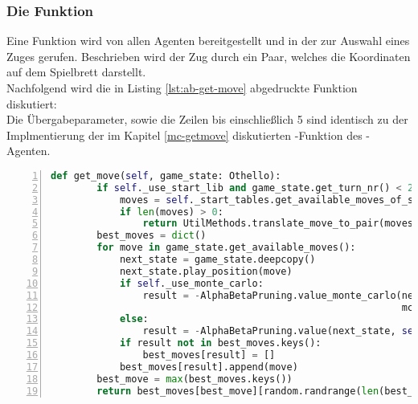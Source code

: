 \subsubsection{Die Funktion }
Eine Funktion  wird von allen Agenten bereitgestellt und in der  zur Auswahl eines Zuges gerufen. Beschrieben wird der Zug durch ein Paar, welches die Koordinaten auf dem Spielbrett darstellt.
\\Nachfolgend wird die in Listing \ref{lst:ab-get-move} abgedruckte Funktion diskutiert:
\\Die Übergabeparameter, sowie die Zeilen bis einschließlich 5 sind identisch zu der Implmentierung der im Kapitel \ref{mc-getmove} diskutierten -Funktion des -Agenten.

\begin{lstlisting}[caption = {get\_move Funktion des Alpha-Beta Spielers}, language = python, captionpos = t , numbers=left, label={lst:ab-get-move}]
    def get_move(self, game_state: Othello):
        if self._use_start_lib and game_state.get_turn_nr() < 21:
            moves = self._start_tables.get_available_moves_of_start_tables(game_state)
            if len(moves) > 0:
                return UtilMethods.translate_move_to_pair(moves[random.randrange(len(moves))])
        best_moves = dict()
        for move in game_state.get_available_moves():
            next_state = game_state.deepcopy()
            next_state.play_position(move)
            if self._use_monte_carlo:
                result = -AlphaBetaPruning.value_monte_carlo(next_state, self._search_depth - 1, self._heuristic,
                                                             mc_count=self._mc_count)
            else:
                result = -AlphaBetaPruning.value(next_state, self._search_depth - 1, self._heuristic)
            if result not in best_moves.keys():
                best_moves[result] = []
            best_moves[result].append(move)
        best_move = max(best_moves.keys())
        return best_moves[best_move][random.randrange(len(best_moves[best_move]))]
\end{lstlisting}
